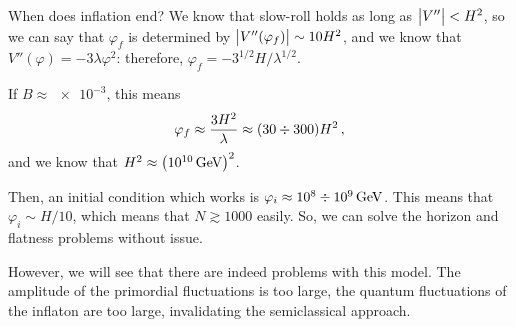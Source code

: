 \documentclass[main.tex]{subfiles}
\begin{document}
When does inflation end?
We know that slow-roll holds as long as \(\abs{V''} < H^2\), so we can say that \(\varphi _f\) is determined by \(\abs{V''(\varphi _f)} \sim 10 H^2\), and we know that \(V''(\varphi ) = - 3 \lambda \varphi^2\): 
therefore, \(\varphi _f = - 3^{1/2} H / \lambda^{1/2}\). 

If \(B \approx \num{e-3}\), this means 
%
\begin{align}
\varphi _f \approx \frac{3 H^2}{\lambda } \approx \qty(30 \divisionsymbol 300) H^2
\,,
\end{align}
%
and we know that \(H^2 \approx \qty(\SI{e10}{GeV})^2\).

Then, an initial condition which works is \(\varphi _i \approx \num{e8} \divisionsymbol \SI{e9}{GeV}\). 
This means that \(\varphi _i \sim H / 10\), which means that \(N \gtrsim 1000\) easily.
So, we can solve the horizon and flatness problems without issue. 

However, we will see that there are indeed problems with this model. 
The amplitude of the primordial fluctuations is too large, the quantum fluctuations of the inflaton are too large, invalidating the semiclassical approach. 
\end{document}
